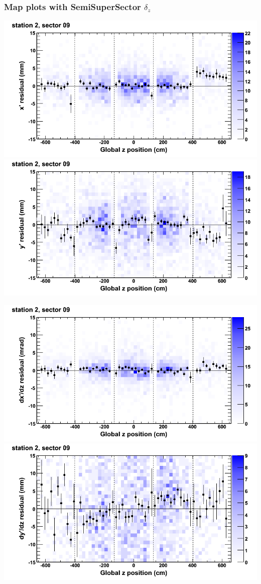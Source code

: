 \documentclass[compress]{beamer}
\begin{document}
\begin{frame}
\frametitle{Map plots with SemiSuperSector $\delta_z$}
\includegraphics[width=0.5\linewidth]{zfit_mapplots/DTvsz_st2sec09_x.png}
\includegraphics[width=0.5\linewidth]{zfit_mapplots/DTvsz_st2sec09_y.png}

\includegraphics[width=0.5\linewidth]{zfit_mapplots/DTvsz_st2sec09_dxdz.png}
\includegraphics[width=0.5\linewidth]{zfit_mapplots/DTvsz_st2sec09_dydz.png}
\end{frame}
\end{document}
